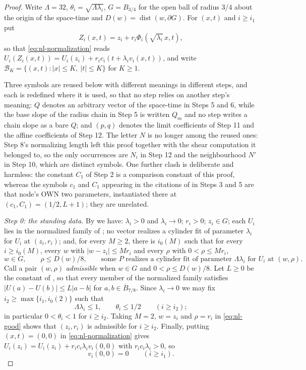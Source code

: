 \begin{proof}
Write $\Lambda=32$, $\theta_i=\sqrt{\Lambda\lambda_i}$, $G=B_{3/4}$ for the open
ball of radius $3/4$ about the origin of the space-time and
$D(w)=\operatorname{dist}(w,\partial G)$. For $(x,t)$ and $i\ge i_1$ put
\[
  Z_i(x,t)=z_i+r_i\Phi_i(\sqrt{\lambda_i}\,x,t),
\]
so that \eqref{eq:nl-normalization} reads
$U_i(Z_i(x,t))=U_i(z_i)+r_ic_i(t+\lambda_iv_i(x,t))$, and write
$\mathcal B_K=\{(x,t):|x|\le K,\ |t|\le K\}$ for $K\ge1$.

Three symbols are reused below with different meanings in different steps, and each
is redefined where it is used, so that no step relies on another step's meaning:
$Q$ denotes an arbitrary vector of the space-time in Steps 5 and 6, while the base
slope of the radius chain in Step 5 is written $Q_m$ and no step writes a chain slope
as a bare $Q$; and $(p,q)$ denotes the limit coefficients of Step 11 and the affine
coefficients of Step 12. The letter $N$ is no longer among the reused ones: Step 8's
normalizing length left this proof together with the shear computation it belonged to,
so the only occurrences are $N_i$ in Step 12 and the neighbourhood $N'$ in Step 10,
which are distinct symbols. One further clash is deliberate and
harmless: the constant $C_1$ of Step 2 is a comparison constant of this proof, whereas
the symbols $c_1$ and $C_1$ appearing in the citations of
 in Steps 3 and 5 are that node's OWN two parameters,
instantiated there at $(c_1,C_1)=(1/2,L+1)$; they are unrelated.

\emph{Step 0: the standing data.}
By  we have: $\lambda_i>0$ and $\lambda_i\to0$;
$r_i>0$; $z_i\in G$; each $U_i$ lies in the normalized family of
; no vector realizes a cylinder fit of parameter
$\lambda_i$ for $U_i$ at $(z_i,r_i)$; and, for every $M\ge2$, there is $i_0(M)$
such that for every $i\ge i_0(M)$, every $w$ with $|w-z_i|\le Mr_i$ and every
$\rho$ with $0<\rho\le Mr_i$,
\begin{equation}\label{eq:nl-good}
  w\in G,\qquad \rho\le D(w)/8,\qquad
  \text{some }P\text{ realizes a cylinder fit of parameter }
  \Lambda\lambda_i\text{ for }U_i\text{ at }(w,\rho).
\end{equation}
Call a pair $(w,\rho)$ \emph{admissible} when $w\in G$ and $0<\rho\le D(w)/8$.
Let $L\ge0$ be the constant of , so that
every member of the normalized family satisfies
$|U(a)-U(b)|\le L|a-b|$ for $a,b\in\overline B_{7/8}$.
Since $\lambda_i\to0$ we may fix $i_2\ge\max\{i_1,i_0(2)\}$ such that
\begin{equation}\label{eq:nl-tail}
  \Lambda\lambda_i\le1,\qquad \theta_i\le1/2\qquad(i\ge i_2);
\end{equation}
in particular $0<\theta_i<1$ for $i\ge i_2$. Taking $M=2$, $w=z_i$ and
$\rho=r_i$ in \eqref{eq:nl-good} shows that $(z_i,r_i)$ is admissible for
$i\ge i_2$.
Finally, putting $(x,t)=(0,0)$ in \eqref{eq:nl-normalization} gives
$U_i(z_i)=U_i(z_i)+r_ic_i\lambda_iv_i(0,0)$ with $r_ic_i\lambda_i>0$, so
\begin{equation}\label{eq:nl-origin}
  v_i(0,0)=0\qquad(i\ge i_1).
\end{equation}


\end{proof}
